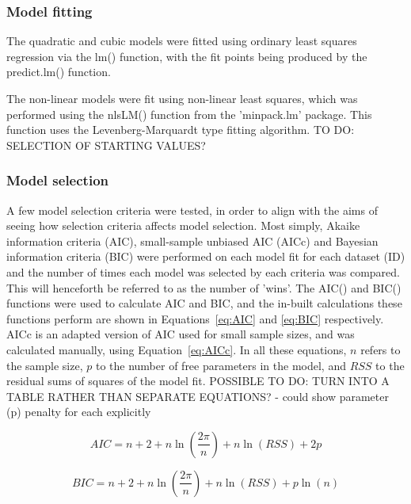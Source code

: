 \documentclass[11pt]{article}
\begin{document}
	\subsubsection*{Model fitting}
	The quadratic and cubic models were fitted using ordinary least squares regression via the lm() function, with the fit points being produced by the predict.lm() function.
	
	The non-linear models were fit using non-linear least squares, which was performed using the nlsLM() function from the 'minpack.lm' package. This function uses the Levenberg-Marquardt type fitting algorithm. TO DO: SELECTION OF STARTING VALUES?
	
	\subsubsection*{Model selection}
	A few model selection criteria were tested, in order to align with the aims of seeing how selection criteria affects model selection. Most simply, Akaike information criteria (AIC), small-sample unbiased AIC (AICc) and Bayesian information criteria (BIC) were performed on each model fit for each dataset (ID) and the number of times each model was selected by each criteria was compared. This will henceforth be referred to as the number of 'wins'. The AIC() and BIC() functions were used to calculate AIC and BIC, and the in-built calculations these functions perform are shown in Equations~\ref{eq:AIC} and \ref{eq:BIC} respectively. AICc is an adapted version of AIC used for small sample sizes, and was calculated manually, using Equation~\ref{eq:AICc}. In all these equations, $n$ refers to the sample size, $p$ to the number of free parameters in the model, and $RSS$ to the residual sums of squares of the model fit. 
	POSSIBLE TO DO: TURN INTO A TABLE RATHER THAN SEPARATE EQUATIONS? - could show parameter (p) penalty for each explicitly
	
	\begin{equation} \label{eq:AIC}
	AIC = n + 2 + n\ln
		\left(
			\frac{2\pi}{n}								\right) 
	+ n\ln(RSS) + 2p
	\end{equation}
	
	\begin{equation} \label{eq:BIC}
	BIC = n + 2 + n\ln
		\left(
			\frac{2\pi}{n}								\right) 
	+ n\ln(RSS) + p\ln(n)
	\end{equation}
	
\end{document}
